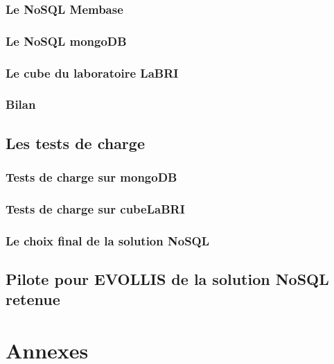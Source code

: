                 \section{Le \textsf{NoSQL Membase}}\label{membase}
                

                \section{Le \textsf{NoSQL mongoDB}}\label{mongodb}
                

                \section{Le \textsf{cube} du laboratoire \textsf{LaBRI}}\label{cube}
                

                \section{Bilan}
                

      \chapter{Les tests de charge}

                \section{Tests de charge sur \textsf{mongoDB}}

                \section{Tests de charge sur \textsf{cubeLaBRI}}
     
                \section{Le choix final de la solution \textsf{NoSQL}}

      \chapter{Pilote pour \textsf{EVOLLIS} de la solution \textsf{NoSQL} retenue}

      

\printindex

\nocite{cassandra2}
\nocite{cassandra}
\nocite{NoSQLCmp}
\nocite{NoSQLeurope}
\nocite{NoSQLvsSQL}



\part{Annexes}
\appendix




